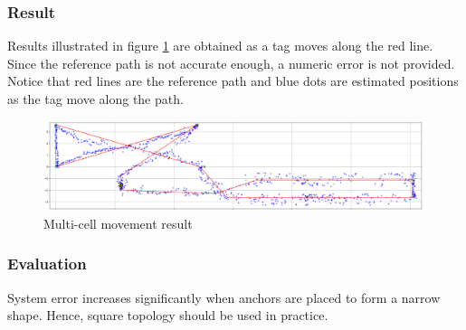 \documentclass[\main/main.tex]{subfiles}
\begin{document}
\subsubsection{Result}

Results illustrated in figure \ref{fig:multi_cell_movement_result} are obtained as a tag moves along the red line. Since the reference path is not accurate enough, a numeric error is not provided. Notice that red lines are the reference path and blue dots are estimated positions as the tag move along the path.
\begin{figure}[H]
    \centering
    \includegraphics[width=1\textwidth]{path.png}
    \caption{Multi-cell movement result}
    \label{fig:multi_cell_movement_result}
\end{figure}
\subsubsection{Evaluation}
System error increases significantly when anchors are placed to form a narrow shape. Hence, square topology should be used in practice.
\end{document}
